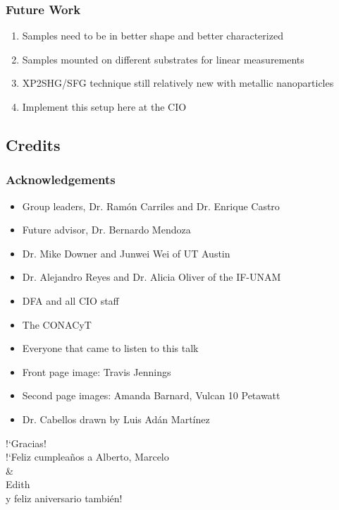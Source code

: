 \documentclass{beamer}
\begin{document}
\begin{frame}
\frametitle{Future Work}
\begin{enumerate}
\item Samples need to be in better shape and better characterized
\item Samples mounted on different substrates for linear measurements
\item XP2SHG/SFG technique still relatively new with metallic nanoparticles
\item Implement this setup here at the CIO
\end{enumerate}
\end{frame}

\subsection{Credits}
\begin{frame}
\frametitle{Acknowledgements}
\begin{itemize}
\item Group leaders, Dr. Ram\'on Carriles and Dr. Enrique Castro
\item Future advisor, Dr. Bernardo Mendoza
\item Dr. Mike Downer and Junwei Wei of UT Austin
\item Dr. Alejandro Reyes and Dr. Alicia Oliver of the IF-UNAM
\item DFA and all CIO staff
\item The CONACyT
\item Everyone that came to listen to this talk
\item Front page image: Travis Jennings
\item Second page images: Amanda Barnard, Vulcan 10 Petawatt
\item Dr. Cabellos drawn by Luis Ad\'an Mart\'inez
\end{itemize}
\end{frame}

\begin{frame}
\begin{center}
{\Huge !`Gracias!}\\\vspace{30pt}
!`Feliz cumplea\~nos a Alberto, Marcelo\\
\&\\
Edith\\y feliz aniversario tambi\'en!
\end{center}
\end{frame}
\end{document}
